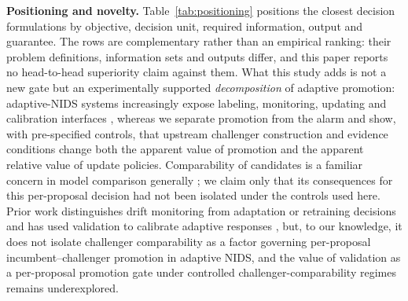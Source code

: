 \documentclass[journal]{IEEEtran}
\begin{document}
\textbf{Positioning and novelty.} Table~\ref{tab:positioning} positions the closest decision formulations by objective, decision unit, required information, output and guarantee. The rows are complementary rather than an empirical ranking: their problem definitions, information sets and outputs differ, and this paper reports no head-to-head superiority claim against them. What this study adds is not a new gate but an experimentally supported \emph{decomposition} of adaptive promotion: adaptive-NIDS systems increasingly expose labeling, monitoring, updating and calibration interfaces \cite{zhang2024caravan,amalapuram2024spider,pederzoli2025noctowl,yuan2026adawu}, whereas we separate promotion from the alarm and show, with pre-specified controls, that upstream challenger construction and evidence conditions change both the apparent value of promotion and the apparent relative value of update policies. Comparability of candidates is a familiar concern in model comparison generally \cite{sawade2012active,karimi2021online}; we claim only that its consequences for this per-proposal decision had not been isolated under the controls used here. Prior work distinguishes drift monitoring from adaptation or retraining decisions \cite{bayram2022degradation,regol2025retrain,bakirov2021automated} and has used validation to calibrate adaptive responses \cite{yuan2026adawu}, but, to our knowledge, it does not isolate challenger comparability as a factor governing per-proposal incumbent--challenger promotion in adaptive NIDS, and the value of validation as a per-proposal promotion gate under controlled challenger-comparability regimes remains underexplored.
\end{document}
